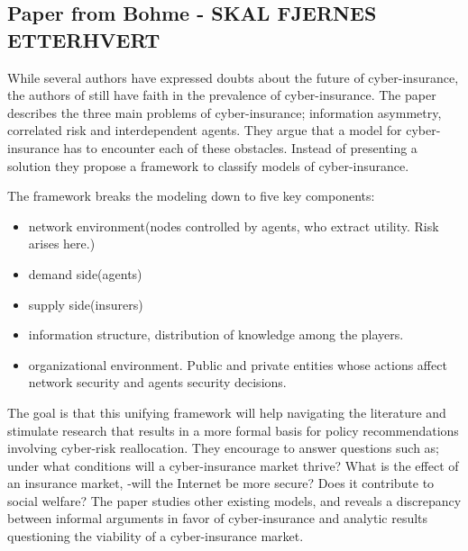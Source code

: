 \subsection{Paper from Bohme - SKAL FJERNES ETTERHVERT}
While several authors have expressed doubts about the future of cyber-insurance, the authors of \cite{bohme2010modeling} still have faith in the prevalence of cyber-insurance. The paper describes the three main problems of cyber-insurance; information asymmetry, correlated risk and interdependent agents. They argue that a model for cyber-insurance has to encounter each of these obstacles. Instead of presenting a solution they propose a framework to classify models of cyber-insurance. 

The framework breaks the modeling down to five key components: 
\begin{itemize}[topsep=-1em,parsep=0em,itemsep=0em] 
 \item network environment(nodes controlled by agents, who extract utility. Risk arises here.)
 \item demand side(agents) 
 \item supply side(insurers) 
 \item information structure, distribution of knowledge among the players. 
 \item organizational environment. Public and private entities whose actions affect network security and agents security decisions.
 
\end{itemize}
The goal is that this unifying framework will help navigating the literature and stimulate research that results in a more formal basis for policy recommendations involving cyber-risk reallocation. They encourage to answer questions such as; under what conditions will a cyber-insurance market thrive? What is the effect of an insurance market, -will the Internet be more secure? Does it contribute to social welfare?
The paper studies other existing models, and reveals a discrepancy between informal arguments in favor of cyber-insurance and analytic results questioning the viability of a cyber-insurance market. 



